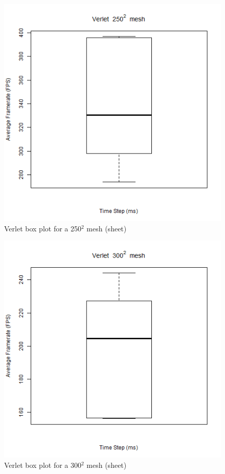       \begin{figure}
    \begin{center}
      \includegraphics[scale=.9]{Figures/sheet_v_250_box}
    \end{center}
    \caption{Verlet box plot for a 250$^{2}$ mesh (sheet)}
    \label{fig:v box 250 sheet}
  \end{figure}
  
      \begin{figure}
    \begin{center}
      \includegraphics[scale=.9]{Figures/sheet_v_300_box}
    \end{center}
    \caption{Verlet box plot for a 300$^{2}$ mesh (sheet)}
    \label{fig:v box 300 sheet}
  \end{figure}

